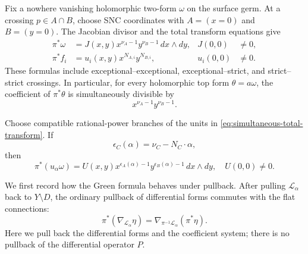 \documentclass[12pt]{amsart}
\numberwithin{equation}{section}
\theoremstyle{plain}
\theoremstyle{definition}
\theoremstyle{remark}
\theoremstyle{definition}
\newcommand{\Lcal}{\mathscr L}
\begin{document}
Fix a nowhere vanishing holomorphic two-form $\omega$ on the surface germ. At a crossing $p\in A\cap B$, choose SNC coordinates with $A=(x=0)$ and $B=(y=0)$. The Jacobian divisor and the total transform equations give
\begin{align}
 \pi^*\omega
 &=J(x,y)x^{\nu_A-1}y^{\nu_B-1}\,dx\wedge dy,
 &J(0,0)&\neq0,
 \label{eq:simultaneous-jacobian}\\
 \pi^*f_i
 &=u_i(x,y)x^{N_{A,i}}y^{N_{B,i}},
 &u_i(0,0)&\neq0.
 \label{eq:simultaneous-total-transform}
\end{align}
These formulas include exceptional--exceptional, exceptional--strict, and strict--strict crossings. In particular, for every holomorphic top form $\theta=a\omega$, the coefficient of $\pi^*\theta$ is simultaneously divisible by
\begin{equation}\label{eq:simultaneous-divisibility}
 x^{\nu_A-1}y^{\nu_B-1}.
\end{equation}

Choose compatible rational-power branches of the units in \eqref{eq:simultaneous-total-transform}. If
\[
 \epsilon_C(\alpha)=\nu_C-N_C\cdot\alpha,
\]
then
\begin{equation}\label{eq:coefficient-form-crossing}
 \pi^*(u_\alpha\omega)
 =U(x,y)x^{\epsilon_A(\alpha)-1} y^{\epsilon_B(\alpha)-1}\,dx\wedge dy,
 \quad U(0,0)\neq0.
\end{equation}

We first record how the Green formula behaves under pullback. After pulling $\Lcal_\alpha$ back to $Y\setminus D$, the ordinary pullback of differential forms commutes with the flat connections:
\begin{equation*}
\pi^*(\nabla_{\Lcal_\alpha}\eta)=\nabla_{\pi^{-1}\Lcal_\alpha}(\pi^*\eta).
\end{equation*}
Here we pull back the differential forms and the coefficient system; there is no pullback of the differential operator $P$.
\end{document}
